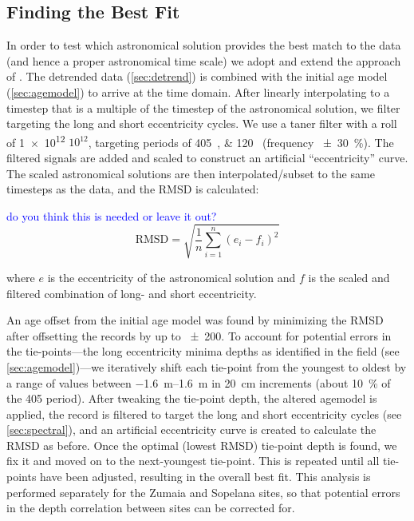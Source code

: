 \documentclass[draft]{agujournal2019}
\newcommand{\ijk}{\textcolor{blue}}
\begin{document}
\subsection{Finding the Best Fit}\label{sec:algorithm}

In order to test which astronomical solution provides the best match to the data
(and hence a proper astronomical time scale)
we adopt and extend the approach of .
The detrended data (\cref{sec:detrend}) is combined with the initial age model (\cref{sec:agemodel}) to arrive at the time domain.
After linearly interpolating to a timestep that is a multiple of the timestep of the astronomical solution, we filter targeting the long and short eccentricity cycles.
We use a taner filter with a roll of \num{1e12} \(10^{12}\), targeting periods of \qtylist{405;120}{\kiloyear} (frequency \qty{\pm30}{\percent}).
The filtered signals are added and scaled to construct an artificial ``eccentricity'' curve.
The scaled astronomical solutions are then interpolated/subset to the same timesteps as the data, and the \gls{RMSD} is calculated:

\ijk{do you think this is needed or leave it out?}
\begin{equation}
    \text{RMSD} = \sqrt{\frac{1}{n}\sum_{i=1}^{n}(e_{i} - f_{i})^{2}}
\end{equation}

where \(e\) is the eccentricity of the astronomical solution and \(f\) is the scaled and filtered combination of long- and short eccentricity.


An age offset from the initial age model was found by minimizing the \gls{RMSD} after offsetting the records by up to \qty{\pm200}{\kiloyear}.
To account for potential errors in the tie-points---the long eccentricity minima depths as identified in the field (see \cref{sec:agemodel})---we iteratively shift each tie-point from the youngest to oldest by a range of values between \qtyrange[range-phrase=~to~]{-1.6}{1.6}{\metre} in \qty{20}{\centi\metre} increments (about \qty{10}{\percent} of the \qty{405}{\kiloyear} period).
After tweaking the tie-point depth, the altered agemodel is applied, the record is filtered to target the long and short eccentricity cycles (see \cref{sec:spectral}), and an artificial eccentricity curve is created to calculate the \gls{RMSD} as before.
Once the optimal (lowest \gls{RMSD}) tie-point depth is found, we fix it and moved on to the next-youngest tie-point.
This is repeated until all tie-points have been adjusted, resulting in the overall best fit.
This analysis is performed separately for the Zumaia and Sopelana sites, so that potential errors in the depth correlation between sites can be corrected for.
\end{document}
